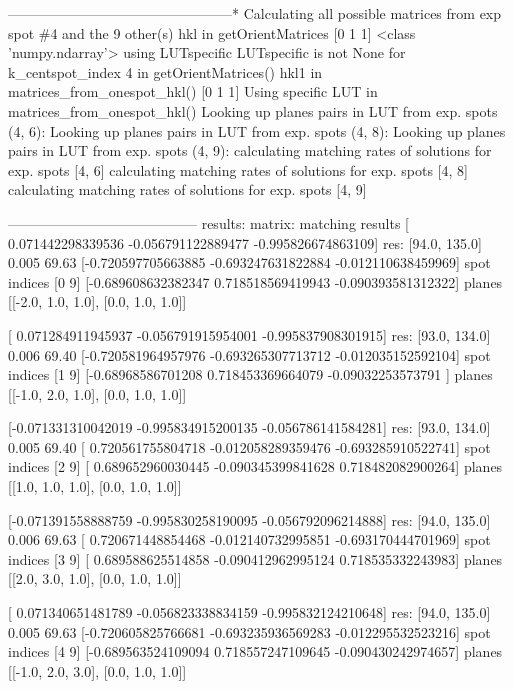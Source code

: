 \documentclass[letterpaper,10pt,english]{sphinxmanual}
\begin{document}
\begin{sphinxalltt}
\sphinxstyleemphasis{---***}------------------------------------------------*
Calculating all possible matrices from exp spot \#4 and the 9 other(s)
hkl in getOrientMatrices {[}0 1 1{]} \textless{}class 'numpy.ndarray'\textgreater{}
using LUTspecific
LUTspecific is not None for k\_centspot\_index 4 in getOrientMatrices()
hkl1 in matrices\_from\_onespot\_hkl() {[}0 1 1{]}
Using specific LUT in matrices\_from\_onespot\_hkl()
Looking up planes pairs in LUT from exp. spots (4, 6):
Looking up planes pairs in LUT from exp. spots (4, 8):
Looking up planes pairs in LUT from exp. spots (4, 9):
calculating matching rates of solutions for exp. spots {[}4, 6{]}
calculating matching rates of solutions for exp. spots {[}4, 8{]}
calculating matching rates of solutions for exp. spots {[}4, 9{]}



-----------------------------------------
results:
matrix:                                         matching results
{[} 0.071442298339536 -0.056791122889477 -0.995826674863109{]}        res: {[}94.0, 135.0{]} 0.005 69.63
{[}-0.720597705663885 -0.693247631822884 -0.012110638459969{]}        spot indices {[}0 9{]}
{[}-0.689608632382347  0.718518569419943 -0.090393581312322{]}        planes {[}{[}-2.0, 1.0, 1.0{]}, {[}0.0, 1.0, 1.0{]}{]}

{[} 0.071284911945937 -0.056791915954001 -0.995837908301915{]}        res: {[}93.0, 134.0{]} 0.006 69.40
{[}-0.720581964957976 -0.693265307713712 -0.012035152592104{]}        spot indices {[}1 9{]}
{[}-0.68968586701208   0.718453369664079 -0.09032253573791 {]}        planes {[}{[}-1.0, 2.0, 1.0{]}, {[}0.0, 1.0, 1.0{]}{]}

{[}-0.071331310042019 -0.995834915200135 -0.056786141584281{]}        res: {[}93.0, 134.0{]} 0.005 69.40
{[} 0.720561755804718 -0.012058289359476 -0.693285910522741{]}        spot indices {[}2 9{]}
{[} 0.689652960030445 -0.090345399841628  0.718482082900264{]}        planes {[}{[}1.0, 1.0, 1.0{]}, {[}0.0, 1.0, 1.0{]}{]}

{[}-0.071391558888759 -0.995830258190095 -0.056792096214888{]}        res: {[}94.0, 135.0{]} 0.006 69.63
{[} 0.720671448854468 -0.012140732995851 -0.693170444701969{]}        spot indices {[}3 9{]}
{[} 0.689588625514858 -0.090412962995124  0.718535332243983{]}        planes {[}{[}2.0, 3.0, 1.0{]}, {[}0.0, 1.0, 1.0{]}{]}

{[} 0.071340651481789 -0.056823338834159 -0.995832124210648{]}        res: {[}94.0, 135.0{]} 0.005 69.63
{[}-0.720605825766681 -0.693235936569283 -0.012295532523216{]}        spot indices {[}4 9{]}
{[}-0.689563524109094  0.718557247109645 -0.090430242974657{]}        planes {[}{[}-1.0, 2.0, 3.0{]}, {[}0.0, 1.0, 1.0{]}{]}


\end{sphinxalltt}
\end{document}
